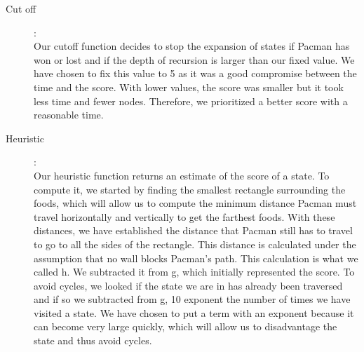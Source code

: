 \documentclass{article}
\begin{document}
\begin{description}
    
    \item[Cut off]:\\
    Our cutoff function decides to stop the expansion of states if Pacman has won or lost and if the depth of recursion is larger than our fixed value. We have chosen to fix this value to 5 as it was a good compromise between the time and the score. With lower values, the score was smaller but it took less time and fewer nodes. Therefore, we prioritized a better score with a reasonable time.

    \item[Heuristic]:\\
    Our heuristic function returns an estimate of the score of a state. To compute it, we started by finding the smallest rectangle surrounding the foods, which will allow us to compute the minimum distance Pacman must travel horizontally and vertically to get the farthest foods.  With these distances, we have established the distance that Pacman still has to travel to go to all the sides of the rectangle. 
    This distance is calculated under the assumption that no wall blocks Pacman's path. This calculation is what we called h. We subtracted it from g, which initially represented the score. To avoid cycles, we looked if the state we are in has already been traversed and if so we subtracted from g, 10 exponent the number of times we have visited a state. We have chosen to put a term with an exponent because it can become very large quickly, which will allow us to disadvantage the state and thus avoid cycles.
    


\end{description}
\end{document}
